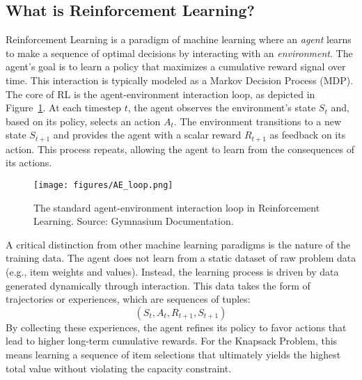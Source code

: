 \subsection{What is Reinforcement Learning?}

Reinforcement Learning is a paradigm of machine learning where an \textit{agent} learns to make a sequence of optimal decisions by interacting with an \textit{environment}.
The agent's goal is to learn a policy that maximizes a cumulative reward signal over time.
This interaction is typically modeled as a Markov Decision Process (MDP).
The core of RL is the agent-environment interaction loop, as depicted in Figure~\ref{fig:ae_loop}.
At each timestep \(t\), the agent observes the environment's state \(S_t\) and, based on its policy, selects an action \(A_t\).
The environment transitions to a new state \(S_{t+1}\) and provides the agent with a scalar reward \(R_{t+1}\) as feedback on its action.
This process repeats, allowing the agent to learn from the consequences of its actions.

\begin{figure}[htbp]
    \centering
    \texttt{[image: figures/AE\_loop.png]}
    \caption{The standard agent-environment interaction loop in Reinforcement Learning. Source: Gymnasium Documentation.}
    \label{fig:ae_loop}
\end{figure}

A critical distinction from other machine learning paradigms is the nature of the training data.
The agent does not learn from a static dataset of raw problem data (e.g., item weights and values).
Instead, the learning process is driven by data generated dynamically through interaction.
This data takes the form of trajectories or experiences, which are sequences of tuples:
\[ (S_t, A_t, R_{t+1}, S_{t+1}) \]
By collecting these experiences, the agent refines its policy to favor actions that lead to higher long-term cumulative rewards.
For the Knapsack Problem, this means learning a sequence of item selections that ultimately yields the highest total value without violating the capacity constraint.